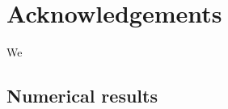 \section*{Acknowledgements}
\label{sec:acknowledgements}
We
\FloatBarrier
\begin{appendices}
\section{Numerical results}
\label{sec:appendixA}


\renewcommand{\TABGFONTSIZE}{\scriptsize}
\newarray\TABGCAPTIONcorrected
{}
\newarray\TABGCAPTIONolddata
{}

%



%


\end{appendices}
